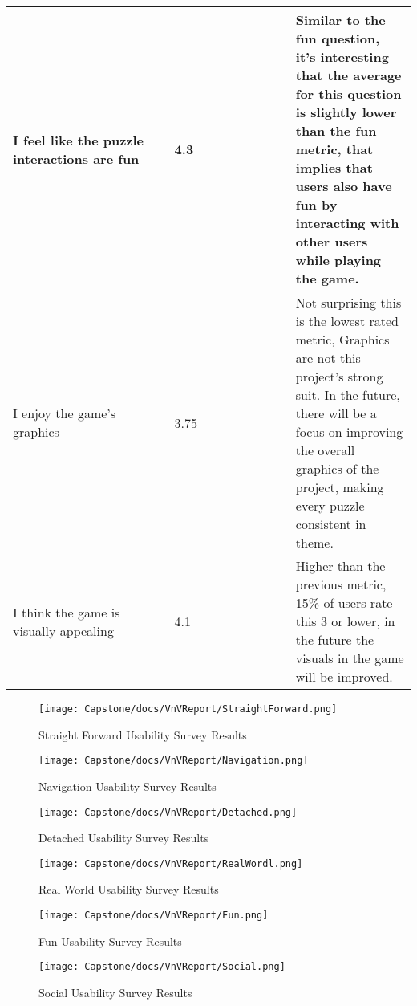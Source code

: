 \documentclass[12pt, titlepage]{article}
\begin{document}
\begin{table}[htbp]
{\begin{tabular}{|p{0.4\linewidth}|p{0.3\linewidth}|p{0.7\linewidth}|}
\hline
I feel like the puzzle interactions are fun & 4.3 & Similar to the fun question, it's interesting that the average for this question is slightly lower than the fun metric, that implies that users also have fun by interacting with other users while playing the game. \\
\hline
I enjoy the game's graphics & 3.75 & Not surprising this is the lowest rated metric, Graphics are not this project's strong suit. In the future, there will be a focus on improving the overall graphics of the project, making every puzzle consistent in theme.  \\
\hline
I think the game is visually appealing & 4.1 & Higher than the previous metric, 15\% of users rate this 3 or lower, in the future the visuals in the game will be improved.\\
\hline
\end{tabular}}
\label{table:US1}
\end{table}

\begin{figure}[htbp]
\caption{Straight Forward Usability Survey Results}
\centerline{\texttt{[image: Capstone/docs/VnVReport/StraightForward.png]}}
\label{fig:StraightForward}
\end{figure}

\begin{figure}[htbp]
\caption{Navigation Usability Survey Results}
\centerline{\texttt{[image: Capstone/docs/VnVReport/Navigation.png]}}
\label{fig:Navigation}
\end{figure}

\begin{figure}[htbp]
\caption{Detached Usability Survey Results}
\centerline{\texttt{[image: Capstone/docs/VnVReport/Detached.png]}}
\label{fig:Detached}
\end{figure}

\begin{figure}[htbp]
\caption{Real World Usability Survey Results}
\centerline{\texttt{[image: Capstone/docs/VnVReport/RealWordl.png]}}
\label{fig:RealWorld}
\end{figure}

\begin{figure}[htbp]
\caption{Fun Usability Survey Results}
\centerline{\texttt{[image: Capstone/docs/VnVReport/Fun.png]}}
\label{fig:Fun}
\end{figure}

\begin{figure}[htbp]
\caption{Social Usability Survey Results}
\centerline{\texttt{[image: Capstone/docs/VnVReport/Social.png]}}
\label{fig:Social}
\end{figure}
\end{document}
